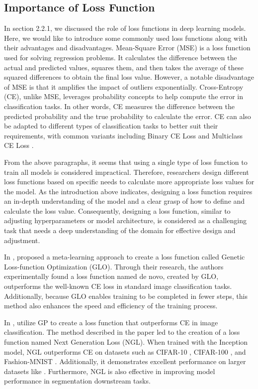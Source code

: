 \begin{ZhChapter}
    \subsection{Importance of Loss Function}
    In section 2.2.1, we discussed the role of loss functions in deep learning models. Here, we would like to introduce some commonly used loss functions along with their advantages and disadvantages. Mean-Square Error (MSE) \cite{wang2009mean} is a loss function used for solving regression problems. It calculates the difference between the actual and predicted values, squares them, and then takes the average of these squared differences to obtain the final loss value. However, a notable disadvantage of MSE is that it amplifies the impact of outliers exponentially. Cross-Entropy (CE), unlike MSE, leverages probability concepts to help compute the error in classification tasks. In other words, CE measures the difference between the predicted probability and the true probability to calculate the error. CE can also be adapted to different types of classification tasks to better suit their requirements, with common variants including Binary CE Loss \cite{ruby2020binary} and Multiclass CE Loss \cite{plaquet2023powerset}.

    From the above paragraphs, it seems that using a single type of loss function to train all models is considered impractical. Therefore, researchers design different loss functions based on specific needs to calculate more appropriate loss values for the model. As the introduction above indicates, designing a loss function requires an in-depth understanding of the model and a clear grasp of how to define and calculate the loss value. Consequently, designing a loss function, similar to adjusting hyperparameters or model architecture, is considered as a challenging task that needs a deep understanding of the domain for effective design and adjustment.

    In \cite{gonzalez2020improvedtrainingspeedaccuracy}, \citeauthor{gonzalez2020improvedtrainingspeedaccuracy} proposed a meta-learning approach to create a loss function called Genetic Loss-function Optimization (GLO). Through their research, the authors experimentally found a loss function named de novo, created by GLO, outperforms the well-known CE loss in standard image classification tasks. Additionally, because GLO enables training to be completed in fewer steps, this method also enhances the speed and efficiency of the training process.

    In \cite{akhmedova2024generationlossfunctionimage}, \citeauthor{akhmedova2024generationlossfunctionimage} utilize GP to create a loss function that outperforms CE in image classification. The method described in the paper led to the creation of a loss function named Next Generation Loss (NGL). When trained with the Inception model, NGL outperforms CE on datasets such as CIFAR-10 \cite{CIFAR-10}, CIFAR-100 \cite{CIFAR-100}, and Fashion-MNIST \cite{xiao2017fashionmnistnovelimagedataset}. Additionally, it demonstrates excellent performance on larger datasets like  \cite{imagenet15russakovsky}. Furthermore, NGL is also effective in improving model performance in segmentation downstream tasks.


\end{ZhChapter}
